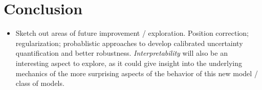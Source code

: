 \documentclass[sn-mathphys]{sn-jnl}%
\theoremstyle{thmstyleone}%
\theoremstyle{thmstyletwo}%
\theoremstyle{thmstylethree}%
\begin{document}
%
%


\section{Conclusion}
\begin{itemize}
\item Sketch out areas of future improvement / exploration. Position correction; regularization; probablistic approaches to develop calibrated uncertainty quantification and better robustness. \emph{Interpretability} will also be an interesting aspect to explore, as it could give insight into the underlying mechanics of the more surprising aspects of the behavior of this new model / class of models.
\end{itemize}
\end{document}
